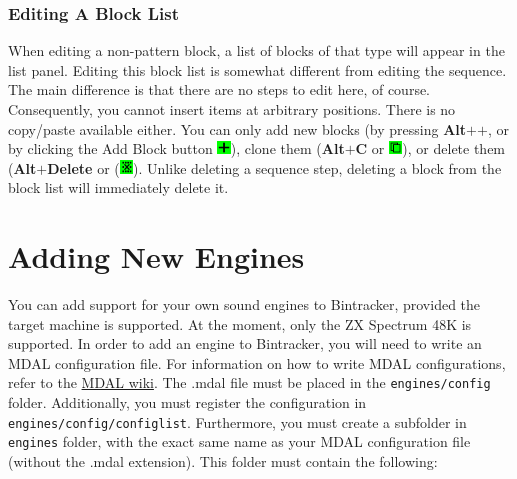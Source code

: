 \documentclass[12pt]{report}	%
\begin{document}
\subsection{Editing A Block List}
\label{subsec:editing-block-list}

When editing a non-pattern block, a list of blocks of that type will appear in the list panel. Editing this block list is somewhat different from editing the sequence. The main difference is that there are no steps to edit here, of course. Consequently, you cannot insert items at arbitrary positions. There is no copy/paste available either. You can only add new blocks (by pressing \textbf{Alt\(\bm{+}\)\(\bm{+}\)}, or by clicking the Add Block button {\includegraphics[width=10pt]{button_plus}}), clone them (\textbf{Alt\(\bm{+}\)C} or {\includegraphics[width=10pt]{button_clone}}), or delete them (\textbf{Alt\(\bm{+}\)Delete} or ({\includegraphics[width=10pt]{button_remove}}). Unlike deleting a sequence step, deleting a block from the block list will immediately delete it.


\chapter{Adding New Engines}

You can add support for your own sound engines to Bintracker, provided the target machine is supported. At the moment, only the ZX Spectrum 48K is supported.
{\sloppy
In order to add an engine to Bintracker, you will need to write an MDAL configuration file. For information on how to write MDAL configurations, refer to the \href{https://github.com/utz82/MDAL/wiki}{MDAL wiki}. The .mdal file must be placed in the \texttt{engines/config} folder. Additionally, you must register the configuration in \texttt{engines/config/configlist}.
}
Furthermore, you must create a subfolder in \texttt{engines} folder, with the exact same name as your MDAL configuration file (without the .mdal extension). This folder must contain the following:
\end{document}
